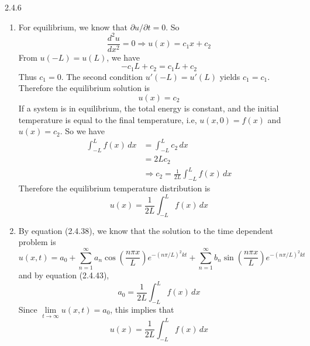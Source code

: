 \documentclass{article}
\theoremstyle{definition}
\begin{document}
	\begin{prob}{2.4.6} $  $
		\begin{enumerate}[label=\alph*.)]
			\item For equilibrium, we know that $ \partial u / \partial t = 0 $. So
			\[
				\frac{d^2 u}{dx^2} = 0 \Rightarrow u(x) = c_1x + c_2
			\]
			From $ u(-L) = u(L) $, we have
			\[
				-c_1L + c_2 = c_1L + c_2	
			\]
			Thus $ c_1 = 0 $. The second condition $ u'(-L) = u'(L) $ yields $ c_1 = c_1 $. Therefore the equilibrium solution is
			\[
				u(x) = c_2
			\]
			If a system is in equilibrium, the total energy is constant, and the initial temperature is equal to the final temperature, i.e, $ u(x,0) = f(x) $ and $ u(x) = c_2 $. So we have
			\begin{align*}
				\int_{-L}^{L} f(x) \, dx & = \int_{-L}^{L} c_2 \, dx \\
				&= 2Lc_2 \\ 
				& \Rightarrow c_2 = \frac{1}{2L} \int_{-L}^{L} f(x) \, dx 
			\end{align*}
			Therefore the equilibrium temperature distribution is
			\[
				u(x) = \frac{1}{2L} \int_{-L}^{L} f(x) \, dx 
			\]
			
			\item By equation (2.4.38), we know that the solution to the time dependent problem is
			\[
				u(x,t) = a_0 + \sum\limits_{n=1}^{\infty} a_n \cos\left( \frac{n\pi x}{L} \right) e^{-(n\pi/L)^2 kt} + \sum\limits_{n=1}^{\infty} b_n \sin\left( \frac{n\pi x}{L} \right) e^{-(n\pi/L)^2kt}
			\]
			and by equation (2.4.43),
			\[
				a_0 = \frac{1}{2L} \int_{-L}^{L} f(x) \, dx
			\]
			Since $ \lim\limits_{t \to \infty} u(x,t) = a_0 $, this implies that 
			\[
				u(x) = \frac{1}{2L} \int_{-L}^{L} f(x) \, dx
			\]
		\end{enumerate}
	\end{prob}
    	

    
    	
    	
    	
    	
    	
    	
    	
\end{document}
